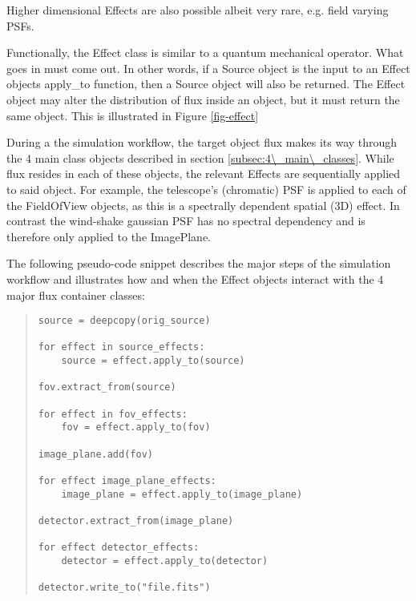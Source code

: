 Higher dimensional Effects are also possible albeit very rare, e.g. field varying PSFs.

Functionally, the Effect class is similar to a quantum mechanical operator.
What goes in must come out.
In other words, if a Source object is the input to an Effect objects \textquotedbl{}apply\_to\textquotedbl{} function, then a Source object will also be returned.
The Effect object may alter the distribution of flux inside an object, but it must return the same object.
This is illustrated in Figure \ref{fig-effect}

During a the simulation workflow, the target object flux makes its way through the 4 main class objects described in section \ref{subsec:4\_main\_classes}.
While flux resides in each of these objects, the relevant Effects are sequentially applied to said object.
For example, the telescope's (chromatic) PSF is applied to each of the FieldOfView objects, as this is a spectrally dependent spatial (3D) effect.
In contrast the wind-shake gaussian PSF has no spectral dependency and is therefore only applied to the ImagePlane.

The following pseudo-code snippet describes the major steps of the simulation workflow and illustrates how and when the Effect objects interact with the 4 major flux container classes:

\begin{quote}
\begin{alltt}
\begin{minipage}[c]{0.95\textwidth}
\begin{lstlisting}[frame=single]
source = deepcopy(orig_source)

for effect in source_effects:
    source = effect.apply_to(source)

fov.extract_from(source)

for effect in fov_effects:
    fov = effect.apply_to(fov)

image_plane.add(fov)

for effect image_plane_effects:
    image_plane = effect.apply_to(image_plane)

detector.extract_from(image_plane)

for effect detector_effects:
    detector = effect.apply_to(detector)

detector.write_to("file.fits")
\end{lstlisting}
\end{minipage}
\end{alltt}
\end{quote}

